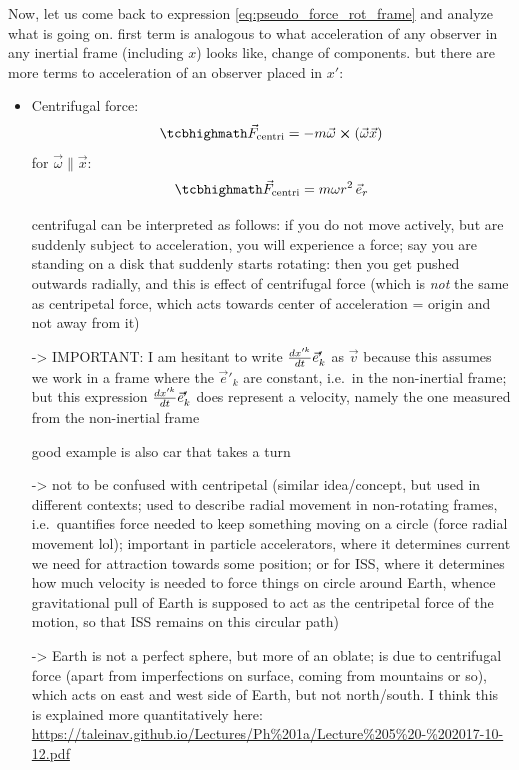 \documentclass[../class_mech_main.tex]{subfiles}
\begin{document}
Now, let us come back to expression \eqref{eq:pseudo_force_rot_frame} and analyze what is going on. first term is analogous to what acceleration of any observer in any inertial frame (including $x$) looks like, change of components. but there are more terms to acceleration of an observer placed in $x'$:
\begin{itemize}
    \item Centrifugal force:
    \begin{equation}\label{eq:f_centrifugal}
		\eqbox{
			\vec{F}_\mathrm{centri} = - m \vec{\omega} \cross (\vec{\omega} \vec{x})
		}
	\end{equation}
	for $\vec{\omega} \parallel \vec{x}$:
	\begin{equation}
		\eqbox{
			\vec{F}_\mathrm{centri} = m \omega r^2 \, \unitvec{r}
		}
	\end{equation}
	
	centrifugal can be interpreted as follows: if you do not move actively, but are suddenly subject to acceleration, you will experience a force; say you are standing on a disk that suddenly starts rotating: then you get pushed outwards radially, and this is effect of centrifugal force (which is \emph{not} the same as centripetal force, which acts towards center of acceleration = origin and not away from it)
    
	-> IMPORTANT: I am hesitant to write $\dv{x'^k}{t} \vec{e}'_k$ as $\vec{v}$ because this assumes we work in a frame where the $\vec{e}'_k$ are constant, i.e.~in the non-inertial frame; but this expression $\dv{x'^k}{t} \vec{e}'_k$ does represent a velocity, namely the one measured from the non-inertial frame
    
    good example is also car that takes a turn
    
    -> not to be confused with centripetal (similar idea/concept, but used in different contexts; used to describe radial movement in non-rotating frames, i.e.~quantifies force needed to keep something moving on a circle (force radial movement lol); important in particle accelerators, where it determines current we need for attraction towards some position; or for ISS, where it determines how much velocity is needed to force things on circle around Earth, whence gravitational pull of Earth is supposed to act as the centripetal force of the motion, so that ISS remains on this circular path)

    -> Earth is not a perfect sphere, but more of an oblate; is due to centrifugal force (apart from imperfections on surface, coming from mountains or so), which acts on east and west side of Earth, but not north/south. I think this is explained more quantitatively here: \url{https://taleinav.github.io/Lectures/Ph%201a/Lecture%205%20-%202017-10-12.pdf}



\end{itemize}
\end{document}
